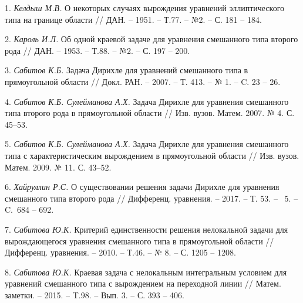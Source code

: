1. {\it Келдыш М.В.} О некоторых случаях вырождения уравнений
эллиптического типа на границе области // ДАН. -- 1951. -- Т.77.
-- №2. -- С. 181 -- 184.

2. {\it Кароль И.Л.} Об одной краевой задаче для уравнения
смешанного типа второго рода
  // ДАН. -- 1953. -- Т.88. -- №2. -- С. 197 -- 200.

3. {\it Сабитов К.Б.} Задача Дирихле для уравнений смешанного
типа в прямоугольной области // Докл. РАН. -- 2007. -- Т. 413. --
№ 1. -- C. 23 -- 26.

4. {\it Сабитов К.Б. Сулейманова А.Х.} Задача Дирихле для уравнения смешанного типа второго рода в прямоугольной области // Изв. вузов. Матем. 2007. № 4. С. 45--53.

5. {\it Сабитов К.Б. Сулейманова А.Х.} Задача Дирихле для уравнения смешанного типа с характеристическим вырождением в прямоугольной области // Изв. вузов. Матем. 2009. № 11. С. 43--52.

6. {\it Хайруллин Р.С.} О существовании решения задачи Дирихле
для уравнения смешанного типа второго рода
// Дифференц. уравнения. -- 2017. -- Т. 53. -- \No~5. -- C.~684 -- 692.

7. {\it Сабитова Ю.К.} Критерий единственности решения
нелокальной задачи для вырождающегося уравнения смешанного типа в
прямоугольной области // Дифференц. уравнения. -- 2010. -- Т.46.
-- № 8. -- С. 1205 -- 1208.

8. {\it Сабитова Ю.К.} Краевая задача с нелокальным интегральным
условием для уравнений смешанного типа с вырождением на переходной
линии // Матем. заметки. -- 2015. -- T.98. -- Вып. 3. -- С. 393 --
406.
